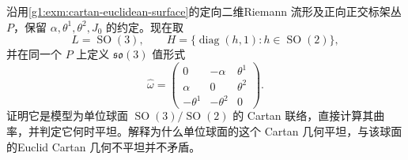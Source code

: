 \begin{exercise}\label{g1:ex:cartan-spherical-model}
	沿用\cref{g1:exm:cartan-euclidean-surface}的定向二维Riemann 流形及正向正交标架丛 \(P\)，保留 \(\alpha,\theta^1,\theta^2,J_0\) 的约定。现在取
	\[
		L=\operatorname{SO}(3),\qquad
		H=\{\operatorname{diag}(h,1):h\in\operatorname{SO}(2)\},
	\]
	并在同一个 \(P\) 上定义 \(\mathfrak{so}(3)\) 值形式
	\[
		\widehat\omega=
		\begin{pmatrix}
			0&-\alpha&\theta^1\\
			\alpha&0&\theta^2\\
			-\theta^1&-\theta^2&0
		\end{pmatrix}.
	\]
	证明它是模型为单位球面 \(\operatorname{SO}(3)/\operatorname{SO}(2)\) 的 Cartan 联络，直接计算其曲率，并判定它何时平坦。解释为什么单位球面的这个 Cartan 几何平坦，与该球面的Euclid  Cartan 几何不平坦并不矛盾。
\end{exercise}
